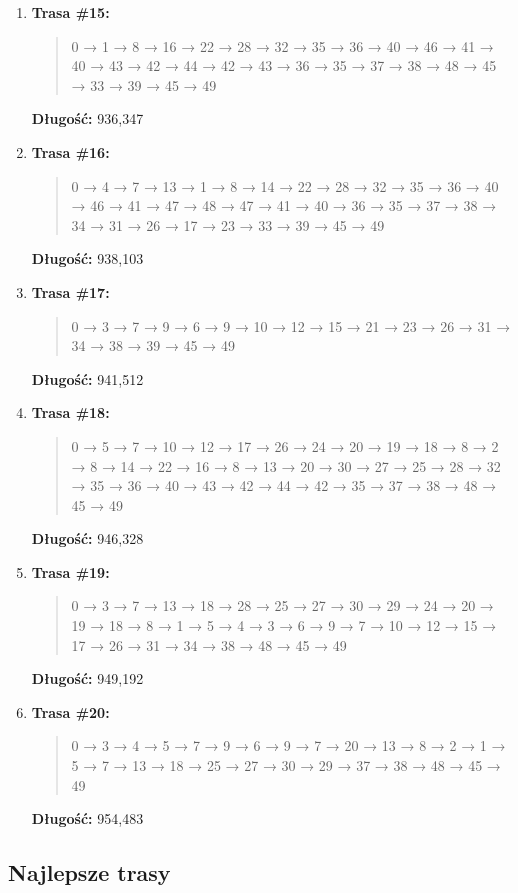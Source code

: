 \documentclass{article}
\begin{document}
\begin{enumerate}
    \item \textbf{Trasa \#15:}
    \begin{quote}
        0 → 1 → 8 → 16 → 22 → 28 → 32 → 35 → 36 → 40 → 46 → 41 → 40 → 43 → 42 → 44 → 42 → 43 → 36 → 35 → 37 → 38 → 48 → 45 → 33 → 39 → 45 → 49
    \end{quote}
    \textbf{Długość:} 936{,}347

    \item \textbf{Trasa \#16:}
    \begin{quote}
        0 → 4 → 7 → 13 → 1 → 8 → 14 → 22 → 28 → 32 → 35 → 36 → 40 → 46 → 41 → 47 → 48 → 47 → 41 → 40 → 36 → 35 → 37 → 38 → 34 → 31 → 26 → 17 → 23 → 33 → 39 → 45 → 49
    \end{quote}
    \textbf{Długość:} 938{,}103

    \item \textbf{Trasa \#17:}
    \begin{quote}
        0 → 3 → 7 → 9 → 6 → 9 → 10 → 12 → 15 → 21 → 23 → 26 → 31 → 34 → 38 → 39 → 45 → 49
    \end{quote}
    \textbf{Długość:} 941{,}512

    \item \textbf{Trasa \#18:}
    \begin{quote}
        0 → 5 → 7 → 10 → 12 → 17 → 26 → 24 → 20 → 19 → 18 → 8 → 2 → 8 → 14 → 22 → 16 → 8 → 13 → 20 → 30 → 27 → 25 → 28 → 32 → 35 → 36 → 40 → 43 → 42 → 44 → 42 → 35 → 37 → 38 → 48 → 45 → 49
    \end{quote}
    \textbf{Długość:} 946{,}328

    \item \textbf{Trasa \#19:}
    \begin{quote}
        0 → 3 → 7 → 13 → 18 → 28 → 25 → 27 → 30 → 29 → 24 → 20 → 19 → 18 → 8 → 1 → 5 → 4 → 3 → 6 → 9 → 7 → 10 → 12 → 15 → 17 → 26 → 31 → 34 → 38 → 48 → 45 → 49
    \end{quote}
    \textbf{Długość:} 949{,}192

    \item \textbf{Trasa \#20:}
    \begin{quote}
        0 → 3 → 4 → 5 → 7 → 9 → 6 → 9 → 7 → 20 → 13 → 8 → 2 → 1 → 5 → 7 → 13 → 18 → 25 → 27 → 30 → 29 → 37 → 38 → 48 → 45 → 49
    \end{quote}
    \textbf{Długość:} 954{,}483

\end{enumerate}

\subsection*{Najlepsze trasy}
\end{document}
